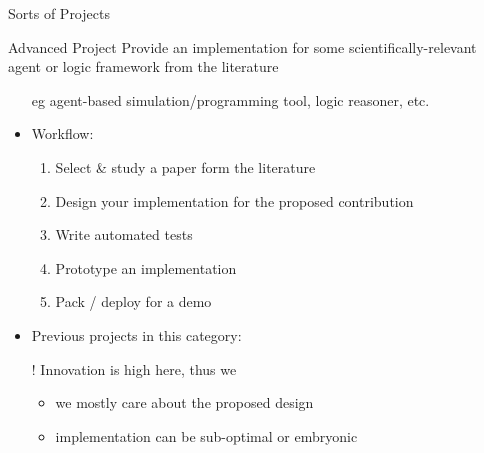 \documentclass[presentation]{beamer}\mode<presentation>{\usetheme{AMSBolognaFC}}
\begin{document}
\begin{frame}[c, allowframebreaks]{Sorts of Projects}
    \begin{block}{Advanced \courseAcronym{} Project}
        Provide an implementation for some \alert{scientifically-relevant} agent or logic framework \alert{from the literature}
        \begin{itemize}
            \item[eg] agent-based simulation/programming tool, logic reasoner, etc.
            \item Workflow:
            \begin{enumerate}
				\item Select \& study a paper form the literature
				\item Design your implementation for the proposed contribution
				\item Write \alert{automated} tests
				\item Prototype an implementation
				\item Pack / deploy for a demo
			\end{enumerate}
            \item Previous projects in this category: 
            \item[!] Innovation is high here, thus we
            \begin{itemize}
                \item we mostly care about the proposed design
                \item implementation can be sub-optimal or embryonic
            \end{itemize}
        \end{itemize}
    \end{block}


\end{frame}
\end{document}
